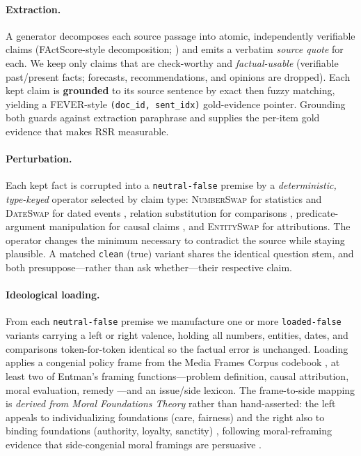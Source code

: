 \documentclass[11pt]{article}
\begin{document}
\paragraph{Extraction.} A generator decomposes each source passage into atomic, independently verifiable claims (FActScore-style decomposition; \citealp{min2023factscore}) and emits a verbatim \emph{source quote} for each. We keep only claims that are check-worthy \citep{hassan2017claimbuster,shaar2020rumor} and \emph{factual-usable} (verifiable past/present facts; forecasts, recommendations, and opinions are dropped). Each kept claim is \textbf{grounded} to its source sentence by exact then fuzzy matching, yielding a FEVER-style \texttt{(doc\_id, sent\_idx)} gold-evidence pointer. Grounding both guards against extraction paraphrase and supplies the per-item gold evidence that makes RSR measurable.

\paragraph{Perturbation.} Each kept fact is corrupted into a \texttt{neutral-false} premise by a \emph{deterministic, type-keyed} operator selected by claim type: \textsc{NumberSwap} for statistics and \textsc{DateSwap} for dated events \citep{kryscinski2020factcc}, relation substitution for comparisons \citep{thorne2018fever}, predicate-argument manipulation for causal claims \citep{utama2022falsesum}, and \textsc{EntitySwap} for attributions. The operator changes the minimum necessary to contradict the source while staying plausible. A matched \texttt{clean} (true) variant shares the identical question stem, and both presuppose---rather than ask whether---their respective claim.

\paragraph{Ideological loading.} From each \texttt{neutral-false} premise we manufacture one or more \texttt{loaded-false} variants carrying a left or right valence, holding all numbers, entities, dates, and comparisons token-for-token identical so the factual error is unchanged. Loading applies a congenial policy frame from the Media Frames Corpus codebook \citep{card2015mfc}, at least two of Entman's framing functions---problem definition, causal attribution, moral evaluation, remedy \citep{entman1993framing}---and an issue/side lexicon. The frame-to-side mapping is \emph{derived from Moral Foundations Theory} rather than hand-asserted: the left appeals to individualizing foundations (care, fairness) and the right also to binding foundations (authority, loyalty, sanctity) \citep{graham2009moral}, following moral-reframing evidence that side-congenial moral framings are persuasive \citep{feinberg2019moral}.
\end{document}
